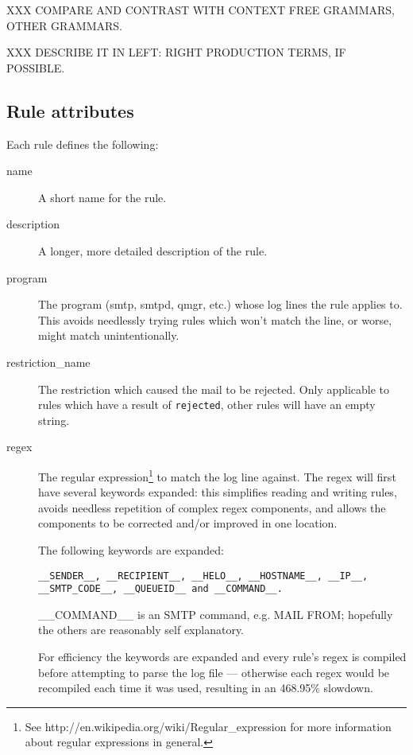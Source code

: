 \documentclass[a4paper,12pt,draft]{article}
\begin{document}
XXX COMPARE AND CONTRAST WITH CONTEXT FREE GRAMMARS, OTHER GRAMMARS.

XXX DESCRIBE IT IN LEFT: RIGHT PRODUCTION TERMS, IF POSSIBLE.

\subsection{Rule attributes}

Each rule defines the following:

\begin{description}

    \item [name] A short name for the rule.

    \item [description] A longer, more detailed description of the rule.

    \item [program] The program (smtp, smtpd, qmgr, etc.) whose log lines
        the rule applies to.  This avoids needlessly trying rules which
        won't match the line, or worse, might match unintentionally.

    \item [restriction\_name] The restriction which caused the mail to be
        rejected.  Only applicable to rules which have a result of
        \texttt{rejected}, other rules will have an empty string.

    \item [regex] The regular expression\footnote{See
        http://en.wikipedia.org/wiki/Regular\_expression for more
        information about regular expressions in general.} to match the log
        line against.  The regex will first have several keywords expanded:
        this simplifies reading and writing rules, avoids needless
        repetition of complex regex components, and allows the components
        to be corrected and/or improved in one location.
        
        The following keywords are expanded:
        
        \texttt{\_\_SENDER\_\_, \_\_RECIPIENT\_\_, \_\_HELO\_\_,
        \_\_HOSTNAME\_\_, \_\_IP\_\_, \newline\_\_SMTP\_CODE\_\_,
        \_\_QUEUEID\_\_ and \_\_COMMAND\_\_.}

        \_\_COMMAND\_\_ is an SMTP command, e.g. MAIL FROM\@; hopefully the
        others are reasonably self explanatory.

        For efficiency the keywords are expanded and every rule's regex is
        compiled before attempting to parse the log file --- otherwise each
        regex would be recompiled each time it was used, resulting in an
        468.95\% slowdown.


\end{description}
\end{document}
